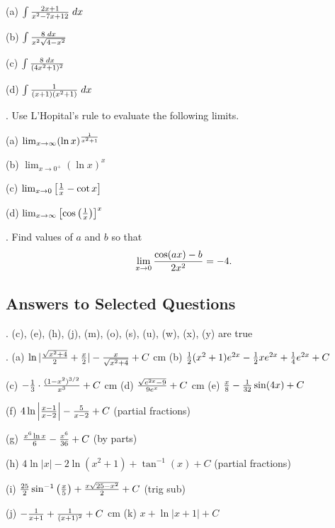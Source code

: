 \documentclass[12pt]{article}
\begin{document}
\noindent (a) $\int {{2x+1}\over{x^2-7x+12}} \; dx$

\noindent (b) $\int {{8 \; dx}\over{x^2 \sqrt{4-x^2}}}$

\noindent (c) $\int {{8 \; dx}\over{(4x^2+1)^2}}$

\noindent (d) $\int {{1}\over{(x+1)(x^2+1)}}\; dx$

\bigskip
{}.  Use L'Hopital's rule to evaluate the following limits.

\noindent (a) $\lim_{x\to\infty}(\ln x)^{{1}\over{x^2+1}}$

\noindent (b) $\lim_{x\to 0^+}(\ln x)^x$

\noindent (c) $\lim_{x \to 0} \left [ {{1}\over{x}} - \cot x 
\right ]$

\noindent (d) $\lim_{x \to \infty} \left [ \cos \left ( {{1}\over{x}} \right ) 
\right ]^x$

\medskip
{}.  Find values of $a$ and $b$ so that
$$\lim_{x \to 0} {{\cos (ax) - b}\over{2x^2}} = -4.$$

\subsection*{Answers to Selected Questions} 

.  (c), (e), (h), (j), (m), (o), (s), (u), (w), (x), (y) are true

. (a) $\ln | {{\sqrt{x^2+4}}\over{2}} + {{x}\over{2}} | - 
{{x}\over{\sqrt{x^2+4}}} + C$
 cm
(b) ${{1}\over{2}} (x^2+1) e^{2x} - {{1}\over{2}}
x e^{2x} + {{1}\over{4}} e^{2x} + C$

\smallskip
\noindent (c) $-{{1}\over{3}} \cdot {{(1-x^2)^{3/2}}\over{x^3}} + C$
 cm (d) ${{\sqrt{e^{2x}-9}}\over{9e^x}} + C$
 cm
(e) ${{x}\over{8}} - {{1}\over{32}} \sin(4x) + C$

\noindent (f)  $4 \ln \left | {{x-1}\over{x-2}} \right | - 
{{5}\over{x-2}} + 
C$ (partial fractions)

\smallskip
\noindent (g) ${{x^6 \ln x}\over{6}} - {{x^6}\over{36}} + C$ (by parts)

\smallskip
\noindent (h)  $4 \ln |x| - 2 \ln (x^2+1) + \tan^{-1} (x) + C$ (partial 
fractions)

\noindent (i) ${{25}\over{2}} \sin^{-1} \left ( {{x}\over{5}} \right ) + 
{{x \sqrt{25-x^2}}\over{2}} + C$ (trig sub)

\noindent (j)  $-{{1}\over{x+1}} + {{1}\over{(x+1)^2}} + C$  cm
(k)  $x + \ln|x+1| + C$ 
\end{document}
